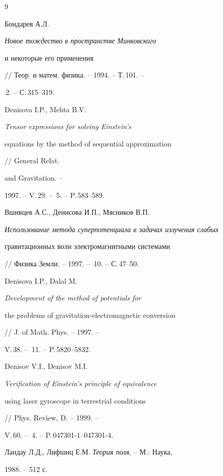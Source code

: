 \begin{thebibliography}{9}







Бондарев А.Л. {\em Новое тождество в пространстве Минковского


и некоторые его применения}


// Теор. и матем. физика. -- 1994. -- Т.\,101. --


\No\,2. -- С.\,315--319.




Denisova I.P., Mehta B.V.


{\em Tensor expressions for solving Einstein's


equations by the method of sequential approximation}


// General Relat. %


and Gravitation. --


1997. -- V.\,29. -- \No\,5. -- P.\,583--589.




Вшивцев А.С., Денисова И.П., Мясников В.П.


{\em Использование метода суперпотенциала в задачах излучения слабых


гравитационных волн электромагнитными системами}


// Физика Земли. -- 1997. -- \No\,10. -- С.\,47--50.




Denisova I.P., Dalal M. {\em Development of the method of potentials for


the problems of gravitation-electromagnetic conversion}


// J. of Math. Phys. -- 1997. --


V.\,38. -- \No\,11. -- P.\,5820--5832.




Denisov V.I., Denisov M.I.


{\em Verification of Einstein's principle of equivalence


using laser gyroscope in terrestrial conditions}


// Phys. Review, D. -- 1999. --


V.\,60. -- \No\,4. -- P.\,047301-1--047301-4.




Ландау Л.Д., Лифшиц Е.М. {\em Теория поля}. -- М.: Наука,


1988. -- 512 с.





\end{thebibliography}





\vskip 2cm












\label{end}





